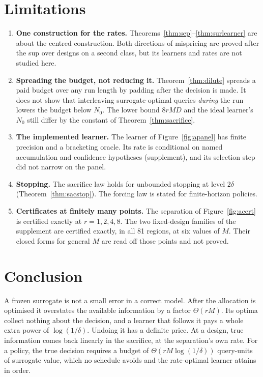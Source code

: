 \section{Limitations}
\label{sec:limits}

\begin{enumerate}
\item[1)] \textbf{One construction for the rates.} Theorems~\ref{thm:sep}--\ref{thm:surlearner}
are about the centred construction. Both directions of mispricing are proved after the sup over
designs on a second class, but its learners and rates are not studied here.
\item[2)] \textbf{Spreading the budget, not reducing it.} Theorem~\ref{thm:dilute} spreads a
paid budget over any run length by padding after the decision is made. It does not show that
interleaving surrogate-optimal queries \emph{during} the run lowers the budget below $N_{0}$.
The lower bound $8rMD$ and the ideal learner's $N_{0}$ still differ by the constant of
Theorem~\ref{thm:sacrifice}.
\item[3)] \textbf{The implemented learner.} The learner of Figure~\ref{fig:apanel} has finite
precision and a bracketing oracle. Its rate is conditional on named accumulation and
confidence hypotheses (supplement), and its selection step did not narrow on the panel.
\item[4)] \textbf{Stopping.} The sacrifice law holds for unbounded stopping at level $2\delta$
(Theorem~\ref{thm:sacstop}). The forcing law is stated for finite-horizon policies.
\item[5)] \textbf{Certificates at finitely many points.} The separation of
Figure~\ref{fig:acert} is certified exactly at $r=1,2,4,8$. The two fixed-design families of the
supplement are certified exactly, in all 81 regions, at six values of $M$. Their closed forms for
general $M$ are read off those points and not proved.
\end{enumerate}

\section{Conclusion}

A frozen surrogate is not a small error in a correct model. After the allocation is optimised
it overstates the available information by a factor $\Theta(rM)$. Its optima collect nothing
about the decision, and a learner that follows it pays a whole extra power of $\log(1/\delta)$.
Undoing it has a definite price. At a design, true information comes back linearly in the
sacrifice, at the separation's own rate. For a policy, the true decision requires a budget of
$\Theta(rM\log(1/\delta))$ query-units of surrogate value, which no schedule avoids and the
rate-optimal learner attains in order.

